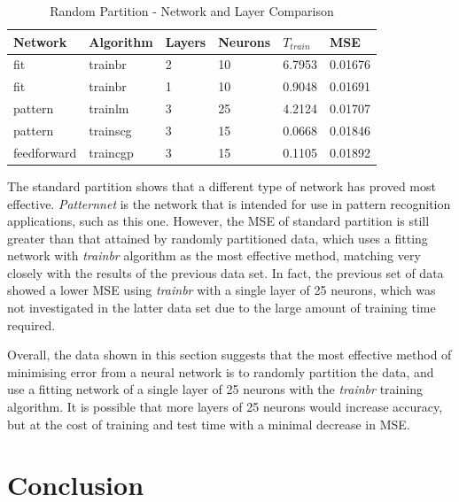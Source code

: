 \documentclass[a4paper, 10pt, conference]{ieeeconf}
\begin{document}
\begin{table}
\centering
\caption{Random Partition - Network and Layer Comparison}
\label{tbl:mixed_networks}
\begin{tabular}{llllll}
\hline
\textbf{Network} & \textbf{Algorithm} & \textbf{Layers} & \textbf{Neurons} & \textbf{$T_{train}$} & \textbf{MSE} \\ \hline
fit & trainbr & 2 & 10 & 6.7953 & 0.01676 \\ \hline
fit & trainbr & 1 & 10 & 0.9048 & 0.01691 \\ \hline
pattern & trainlm & 3 & 25 & 4.2124 & 0.01707 \\ \hline
pattern & trainscg & 3 & 15 & 0.0668& 0.01846 \\ \hline
feedforward & traincgp & 3 & 15 & 0.1105 & 0.01892 \\ \hline
\end{tabular}
\end{table}

The standard partition shows that a different type of network has proved most effective. \textit{Patternnet} is the network that is intended for use in pattern recognition applications, such as this one. However, the MSE of standard partition is still greater than that attained by randomly partitioned data, which uses a fitting network with \textit{trainbr} algorithm as the most effective method, matching very closely with the results of the previous data set. In fact, the previous set of data showed a lower MSE using \textit{trainbr} with a single layer of 25 neurons, which was not investigated in the latter data set due to the large amount of training time required.

Overall, the data shown in this section suggests that the most effective method of minimising error from a neural network is to randomly partition the data, and use a fitting network of a single layer of 25 neurons with the \textit{trainbr} training algorithm. It is possible that more layers of 25 neurons would increase accuracy, but at the cost of training and test time with a minimal decrease in MSE.


\section{Conclusion}
\end{document}
